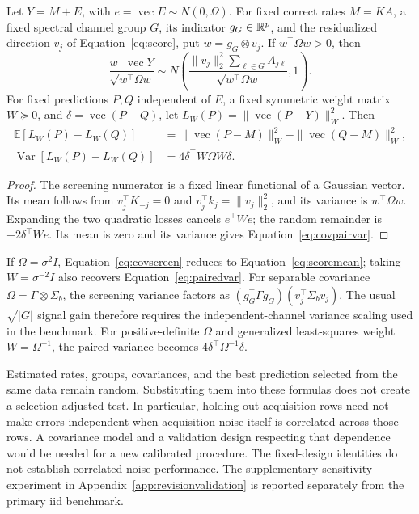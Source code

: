 \begin{Proposition}\label{prop:covariance}
Let $Y=M+E$, with $e=\operatorname{vec}E\sim N(0,\Omega)$. For fixed correct rates $M=KA$, a fixed spectral channel group $G$, its indicator $g_G\in\mathbb{R}^p$, and the residualized direction $v_j$ of Equation~\eqref{eq:score}, put $w=g_G\otimes v_j$. If $w^\top\Omega w>0$, then
\begin{equation}\label{eq:covscreen}
 \frac{w^\top\operatorname{vec}Y}{\sqrt{w^\top\Omega w}}
 \sim N\!\left(\frac{\|v_j\|_2^2\sum_{\ell\in G}A_{j\ell}}
                    {\sqrt{w^\top\Omega w}},1\right).
\end{equation}
For fixed predictions $P,Q$ independent of $E$, a fixed symmetric weight matrix $W\succeq0$, and $\delta=\operatorname{vec}(P-Q)$, let $L_W(P)=\|\operatorname{vec}(P-Y)\|_W^2$. Then
\begin{align}
 \mathbb E[L_W(P)-L_W(Q)]
 &=\|\operatorname{vec}(P-M)\|_W^2-\|\operatorname{vec}(Q-M)\|_W^2,\label{eq:covpairmean}\\
 \operatorname{Var}[L_W(P)-L_W(Q)]&=4\delta^\top W\Omega W\delta.\label{eq:covpairvar}
\end{align}
\end{Proposition}
\begin{proof}
The screening numerator is a fixed linear functional of a Gaussian vector. Its mean follows from $v_j^\top K_{-j}=0$ and $v_j^\top k_j=\|v_j\|_2^2$, and its variance is $w^\top\Omega w$. Expanding the two quadratic losses cancels $e^\top We$; the random remainder is $-2\delta^\top We$. Its mean is zero and its variance gives Equation~\eqref{eq:covpairvar}.
\end{proof}

If $\Omega=\sigma^2I$, Equation~\eqref{eq:covscreen} reduces to Equation~\eqref{eq:scoremean}; taking $W=\sigma^{-2}I$ also recovers Equation~\eqref{eq:pairedvar}. For separable covariance $\Omega=\Gamma\otimes\Sigma_b$, the screening variance factors as $(g_G^\top\Gamma g_G)(v_j^\top\Sigma_bv_j)$. The usual $\sqrt{|G|}$ signal gain therefore requires the independent-channel variance scaling used in the benchmark. For positive-definite $\Omega$ and generalized least-squares weight $W=\Omega^{-1}$, the paired variance becomes $4\delta^\top\Omega^{-1}\delta$.

Estimated rates, groups, covariances, and the best prediction selected from the same data remain random. Substituting them into these formulas does not create a selection-adjusted test. In particular, holding out acquisition rows need not make errors independent when acquisition noise itself is correlated across those rows. A covariance model and a validation design respecting that dependence would be needed for a new calibrated procedure. The fixed-design identities do not establish correlated-noise performance. The supplementary sensitivity experiment in Appendix~\ref{app:revisionvalidation} is reported separately from the primary iid benchmark.
